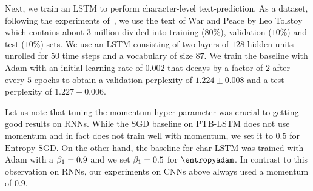\documentclass[10pt]{article}
\newcommand{\entropysgd}{\mathrm{Entropy}\textrm{-}\mathrm{SGD}}
\newcommand{\charlstm}{\textrm{char-LSTM}}
\newcommand{\ptblstm}{\textrm{PTB-LSTM}}
\begin{document}
Next, we train an LSTM to perform character-level text-prediction. As a dataset, following the experiments of~\citet{karpathy2015visualizing}, we use the text of War and Peace by Leo Tolstoy which contains about $3$ million divided into training ($80\%$), validation ($10\%$) and test ($10\%$) sets. We use an LSTM consisting of two layers of $128$ hidden units unrolled for $50$ time steps and a vocabulary of size $87$. We train the baseline with Adam with an initial learning rate of $0.002$ that decays by a factor of $2$ after every $5$ epochs to obtain a validation perplexity of $1.224 \pm 0.008$ and a test perplexity of $1.227 \pm 0.006$.

Let us note that tuning the momentum hyper-parameter was crucial to getting good results on RNNs. While the SGD baseline on $\ptblstm$ does not use momentum and in fact does not train well with momentum, we set it to $0.5$ for $\entropysgd$. On the other hand, the baseline for $\charlstm$ was trained with Adam with a $\beta_1 = 0.9$ and we set $\beta_1 = 0.5$ for $\entropyadam$. In contrast to this observation on RNNs, our experiments on CNNs above always used a momentum of $0.9$.
\end{document}
